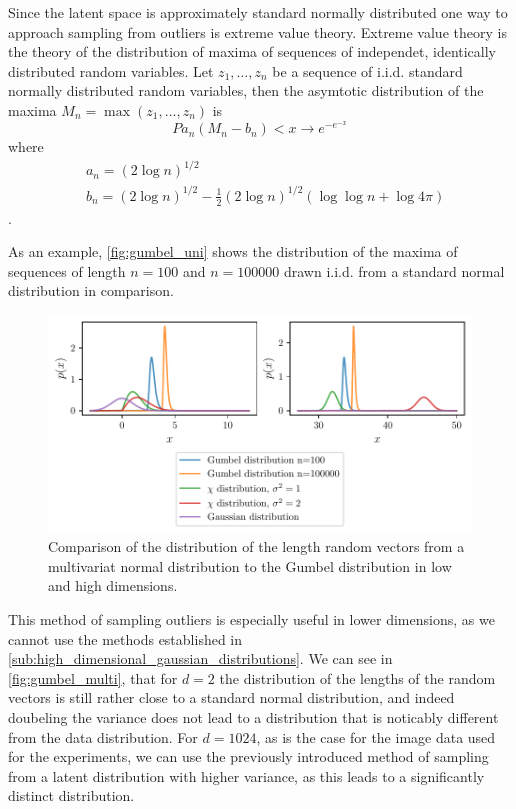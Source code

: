 Since the latent space is approximately standard normally distributed one way
to approach sampling from outliers is extreme value theory. Extreme value
theory is the theory of the distribution of maxima of sequences of independet,
identically distributed random variables. Let $z_1, \dots, z_n$ be a sequence
of i.i.d. standard normally distributed random variables, then the asymtotic
distribution of the maxima $M_n = \max (z_1, \dots, z_n)$ is
\begin{equation}%
	\label{eq:gumbel_distribution}
	P{a_n ( M_n - b_n ) < x} \rightarrow e^{-e^{-x}}
\end{equation}
where
\begin{equation}
	\begin{aligned}%
		\label{eq:gumbel_params}
		 & a_n = (2 \log n )^{1/2}                                            \\
		 & b_n = (2 \log n )^{1/2} - \frac{1}{2} (2 \log n )^{1/2} (\log \log
		n + \log 4 \pi)
	\end{aligned}
\end{equation}
\citep{leadbetterAsymptoticDistributionsExtremes1983}.

As an example, \autoref{fig:gumbel_uni} shows the distribution of the maxima of
sequences of length $n = 100$ and $n = 100000$ drawn i.i.d. from a standard
normal distribution in comparison.
\begin{figure}[htpb]
	\centering
        \includegraphics{figures/samples/gumbel_multi.pdf}
	\caption{Comparison of the distribution of the length random vectors
		from a multivariat normal distribution to the Gumbel distribution in
		low and high dimensions.}%
	\label{fig:gumbel_multi}
\end{figure}

This method of sampling outliers is especially useful in lower dimensions, as
we cannot use the methods established in
\autoref{sub:high_dimensional_gaussian_distributions}. We can see in
\autoref{fig:gumbel_multi}, that for $d=2$ the distribution of the lengths of
the random vectors is still rather close to a standard normal distribution, and
indeed doubeling the variance does not lead to a distribution that is noticably
different from the data distribution. For $d=1024$, as is the case for the
image data used for the experiments, we can use the previously introduced
method of sampling from a latent distribution with higher variance, as this
leads to a significantly distinct distribution.

